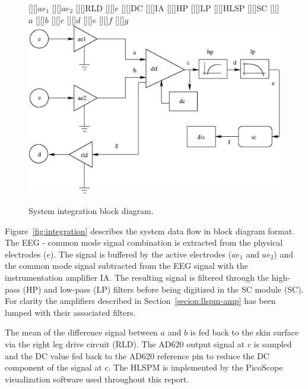 \begin{figure}[htbp]
\begin{center}
	[][]{$ae_1$}
	[][]{$ae_2$}
	[][]{RLD}
	[][]{$e$}
	[][]{DC}
	[][]{IA}
	[][]{HP}
	[][]{LP}
	[][]{HLSP}
	[][]{SC}
	[][]{$a$}
	[][]{$b$}
	[][]{$c$}
	[][]{$d$}
	[][]{$e$}
	[][]{$f$}
	[][]{$g$}
	\includegraphics[width=\textwidth]{integration.eps}
	\caption{System integration block diagram.}
\label{fig:integration}
\end{center}
\end{figure}

Figure~\vref{fig:integration} describes the system data flow in block
diagram format. The EEG - common mode signal combination is extracted
from the physical electrodes ($e$). The signal is buffered by the
active electrodes ($ae_1$ and $ae_2$) and the common mode signal
subtracted from the EEG signal with the instrumentation amplifier
IA. The resulting signal is filtered through the high-pass (HP) and
low-pass (LP) filters before being digitized in the SC module
(SC). For clarity the amplifiers described in
Section~\ref{secion:llspm-amp} has been lumped with their associated
filters.

The mean of the difference signal between $a$ and $b$ is fed back to
the skin surface via the right leg drive circuit (RLD). The AD620
output signal at $c$ is sampled and the DC value fed back to the AD620
reference pin to reduce the DC component of the signal at $c$. The
HLSPM is implemented by the PicoScope visualization software used
throughout this report.


